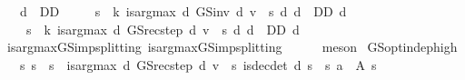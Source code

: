 \begin{isabellebody}
\ \ \ {\isachardoublequoteopen}d\ {\isasymin}\ D\isactrlsub D{\isachardoublequoteclose}\ \isanewline
\ \ \ {\isachardoublequoteopen}\ {\isacharparenleft}{\kern0pt}{\isasymforall}s\ {\isasymle}\ k{\isachardot}{\kern0pt}\ is{\isacharunderscore}{\kern0pt}arg{\isacharunderscore}{\kern0pt}max\ {\isacharparenleft}{\kern0pt}{\isasymlambda}d{\isachardot}{\kern0pt}\ GS{\isacharunderscore}{\kern0pt}inv\ d\ v\ {\isachardollar}{\kern0pt}\ s{\isacharparenright}{\kern0pt}\ {\isacharparenleft}{\kern0pt}{\isasymlambda}d{\isachardot}{\kern0pt}\ d\ {\isasymin}\ D\isactrlsub D{\isacharparenright}{\kern0pt}\ d{\isacharparenright}{\kern0pt}\ {\isasymlongleftrightarrow}\isanewline
\ \ \ \ {\isacharparenleft}{\kern0pt}{\isasymforall}s\ {\isasymle}\ k{\isachardot}{\kern0pt}\ is{\isacharunderscore}{\kern0pt}arg{\isacharunderscore}{\kern0pt}max\ {\isacharparenleft}{\kern0pt}{\isasymlambda}d{\isachardot}{\kern0pt}\ GS{\isacharunderscore}{\kern0pt}rec{\isacharunderscore}{\kern0pt}step\ d\ v\ {\isachardollar}{\kern0pt}\ s{\isacharparenright}{\kern0pt}\ {\isacharparenleft}{\kern0pt}{\isasymlambda}d{\isachardot}{\kern0pt}\ d\ {\isasymin}\ D\isactrlsub D{\isacharparenright}{\kern0pt}\ d{\isacharparenright}{\kern0pt}{\isachardoublequoteclose}\isanewline
%
\isadelimproof
\ \ %
\endisadelimproof
%
\isatagproof
{}\isamarkupfalse%
\ is{\isacharunderscore}{\kern0pt}arg{\isacharunderscore}{\kern0pt}max{\isacharunderscore}{\kern0pt}GS{\isacharunderscore}{\kern0pt}imp{\isacharunderscore}{\kern0pt}splitting{\isacharprime}{\kern0pt}\ is{\isacharunderscore}{\kern0pt}arg{\isacharunderscore}{\kern0pt}max{\isacharunderscore}{\kern0pt}GS{\isacharunderscore}{\kern0pt}imp{\isacharunderscore}{\kern0pt}splitting{\isacharprime}{\kern0pt}{\isacharprime}{\kern0pt}\ \ \isanewline
\ \ \isamarkupfalse%
\ meson%
\endisatagproof
{\isafoldproof}%
%
\isadelimproof
\isanewline
%
\endisadelimproof
\isanewline
{}\isamarkupfalse%
\ GS{\isacharunderscore}{\kern0pt}opt{\isacharunderscore}{\kern0pt}indep{\isacharunderscore}{\kern0pt}high{\isacharcolon}{\kern0pt}\isanewline
\ \ \ {\isachardoublequoteopen}{\isacharparenleft}{\kern0pt}{\isasymAnd}s{\isacharprime}{\kern0pt}{\isachardot}{\kern0pt}\ s{\isacharprime}{\kern0pt}\ {\isacharless}{\kern0pt}\ s\ {\isasymLongrightarrow}\ is{\isacharunderscore}{\kern0pt}arg{\isacharunderscore}{\kern0pt}max\ {\isacharparenleft}{\kern0pt}{\isasymlambda}d{\isachardot}{\kern0pt}\ GS{\isacharunderscore}{\kern0pt}rec{\isacharunderscore}{\kern0pt}step\ d\ v\ {\isachardollar}{\kern0pt}\ s{\isacharprime}{\kern0pt}{\isacharparenright}{\kern0pt}\ is{\isacharunderscore}{\kern0pt}dec{\isacharunderscore}{\kern0pt}det\ d{\isacharparenright}{\kern0pt}{\isachardoublequoteclose}\ {\isachardoublequoteopen}s{\isacharprime}{\kern0pt}\ {\isacharless}{\kern0pt}\ s{\isachardoublequoteclose}\ {\isachardoublequoteopen}a\ {\isasymin}\ A\ s{\isachardoublequoteclose}\isanewline

\end{isabellebody}
